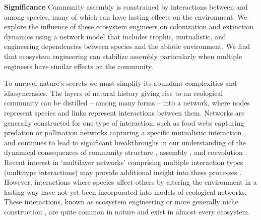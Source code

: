 \documentclass[twocolumn,preprintnumbers,amsmath,amssymb,superscriptaddress]{revtex4}
\begin{document}
\maketitle


\vspace{3mm}
\begin{adjustwidth}{2.5em}{0em}
\textbf{Significance} Community assembly is constrained by interactions between and among species, many of which can have lasting effects on the environment. We explore the influence of these ecosystem engineers on colonization and extinction dynamics using a network model that includes trophic, mutualistic, and engineering dependencies between species and the abiotic environment. We find that ecosystem engineering can stabilize assembly particularly when multiple engineers have similar effects on the community.\\
\end{adjustwidth}



To unravel nature's secrets we must simplify its abundant complexities and idiosyncrasies.
The layers of natural history giving rise to an ecological community can be distilled -- among many forms -- into a network, where nodes represent species and links represent interactions between them.
Networks are generally constructed for one type of interaction, such as food webs capturing predation \cite{Paine1966,Dunne2002,Pascual2006} or pollination networks capturing a specific mutualistic interaction \cite{Bascompte2013}, and continues to lead to significant breakthroughs in our understanding of the dynamical consequences of community structure \cite{May1972,Gross2009,Allesina2012}, assembly \cite{Ponisio2017}, and coevolution \cite{Guimaraes2017}. 
Recent interest in `multilayer networks' comprising multiple interaction types (multitype interactions) may provide additional insight into these processes \cite{Kefi2016,Pilosof2017}. 
However, interactions where species affect others by altering the environment in a lasting way have not yet been incorporated into models of ecological networks. 
These interactions, known as ecosystem engineering \cite{Lawton1994,OdlingSmee2013} or more generally niche construction \cite{OdlingSmee2013b,Fukami2015}, are quite common in nature and exist in almost every ecosystem.
\end{document}
